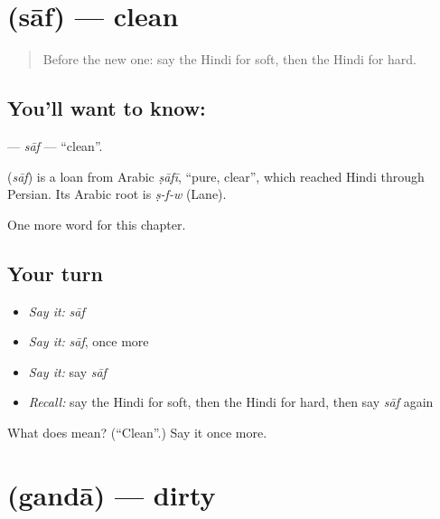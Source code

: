 \section[\texorpdfstring{\hi{साफ़} (sāf)}{साफ़ (sāf)}]{ (sāf) — clean}

\label{lesson:HI-C155-saf}



\begin{quote}
Before the new one: say the Hindi for soft, then the Hindi for hard.
\end{quote}

\subsection*{You'll want to know: }
\textbf{} — \emph{sāf} — \textquotedblleft{}clean\textquotedblright{}.

\begin{cousinweb}
\textbf{} (\emph{sāf}) is a loan from Arabic \emph{ṣāfī}, \textquotedblleft{}pure, clear\textquotedblright{}, which reached Hindi through Persian. Its Arabic root is \emph{ṣ-f-w} (Lane).
\end{cousinweb}

\begin{grammarlens}[title={What you've built}]
One more word for this chapter.
\end{grammarlens}

\subsection*{Your turn}
\begin{itemize}
\raggedright
  \item \emph{Say it:} \emph{sāf}
  \item \emph{Say it:} \emph{sāf}, once more
  \item \emph{Say it:} say \emph{sāf}
  \item \emph{Recall:} say the Hindi for soft, then the Hindi for hard, then say \emph{sāf} again
\end{itemize}

\begin{tcolorbox}[breakable,colback=teal!4,colframe=teal!35!black,title={Before you move on}]
What does  mean? (\textquotedblleft{}Clean\textquotedblright{}.) Say it once more.
\end{tcolorbox}
\section[\texorpdfstring{\hi{गंदा} (gandā)}{गंदा (gandā)}]{ (gandā) — dirty}

